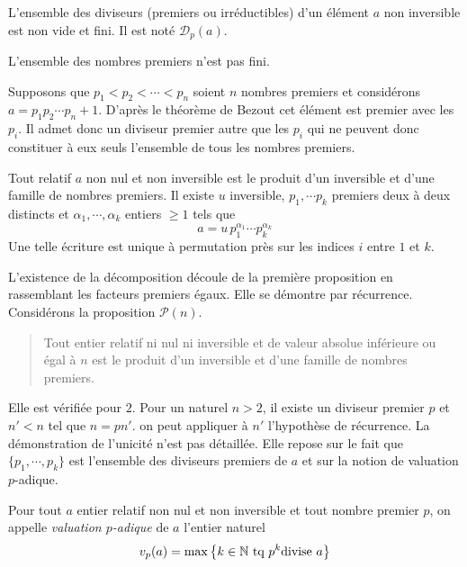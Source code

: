 \begin{nota}
L'ensemble des diviseurs (premiers ou irréductibles) d'un élément $a$ non inversible est non vide et fini. Il est noté $\mathcal D_p(a)$. 
\end{nota}
\begin{prop}
L'ensemble des nombres premiers n'est pas fini. 
\end{prop}
\begin{demo}
 Supposons que $p_1<p_2<\cdots<p_n$ soient $n$ nombres premiers  et considérons $a=p_1p_2\cdots p_n+1$. D'après le théorème de Bezout cet élément est premier avec les $p_i$. Il admet donc un diviseur premier autre que les $p_i$ qui ne peuvent donc constituer à eux seuls l'ensemble de tous les nombres premiers. 
\end{demo}
\begin{prop}
Tout relatif $a$ non nul et non inversible est le produit d'un inversible et d'une famille de nombres premiers.\newline 
 Il existe  $u$ inversible, $p_1,\cdots p_k$ premiers deux à deux distincts et $\alpha_1,\cdots,\alpha_k$ entiers $\geq 1$ tels que
\begin{displaymath}
 a = u \, p_1^{\alpha_1} \cdots p_k^{\alpha_k} 
\end{displaymath}
Une telle écriture est unique à permutation près sur les indices $i$ entre $1$ et $k$.
\end{prop}
\begin{demo}
 L'existence de la décomposition découle de la première proposition en rassemblant les facteurs premiers égaux. Elle se démontre par récurrence.\newline
Considérons la proposition $\mathcal{P}(n)$.
\begin{quote}
  Tout entier relatif ni nul ni inversible et de valeur absolue inférieure ou égal à $n$ est le produit d'un inversible et d'une famille de nombres premiers.
\end{quote}
Elle est vérifiée pour $2$. Pour un naturel $n>2$, il existe un diviseur premier $p$ et $n'<n$ tel que $n=pn'$. on peut appliquer à $n'$ l'hypothèse de récurrence.\newline 
La démonstration de l'unicité n'est pas détaillée. Elle repose sur le fait que $\{p_1,\cdots,p_k\}$ est l'ensemble des diviseurs premiers de $a$ et sur la notion de valuation $p$-adique.
\end{demo}
\begin{defi}
Pour tout $a$ entier relatif non nul et non inversible et tout nombre premier $p$, on appelle \emph{valuation $p$-adique} de $a$ l'entier naturel
\begin{displaymath}
  v_p(a) = \max\left\lbrace k\in \mathbb{N} \text{ tq } p^k \text{divise } a\right\rbrace 
\end{displaymath}
\end{defi}
